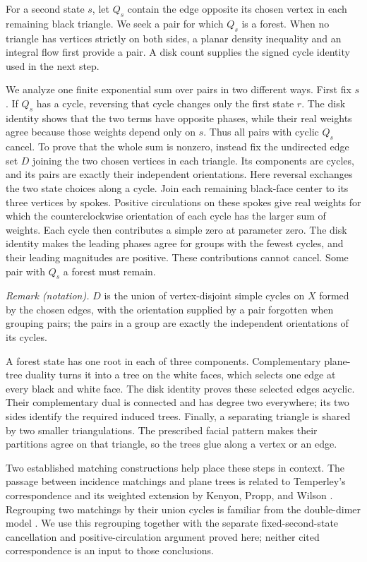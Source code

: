 \documentclass[11pt]{article}
\theoremstyle{remark}
\numberwithin{equation}{section}
\begin{document}
For a second state \(s\), let \(Q_s\) contain the edge opposite its
chosen vertex in each remaining black triangle. We seek a pair for which
\(Q_s\) is a forest. When no triangle has vertices strictly on both sides,
a planar density inequality and an integral flow first provide a pair.
A disk count supplies the signed cycle identity used in the next step.

We analyze one finite exponential sum over pairs in two different ways.
First fix \(s\). If \(Q_s\) has a cycle, reversing that cycle changes
only the first state \(r\). The disk identity shows that the two terms
have opposite phases, while their real weights agree because those
weights depend only on \(s\). Thus all pairs with cyclic \(Q_s\) cancel.
To prove that the whole sum is nonzero, instead fix the undirected edge
set \(D\) joining the two chosen vertices in each triangle. Its components
are cycles, and its pairs are exactly their independent orientations.
Here reversal exchanges the two state choices along a cycle. Join each
remaining black-face center to its three vertices by spokes. Positive circulations
on these spokes give real weights for which the counterclockwise
orientation of each cycle has the larger sum of weights.
Each cycle then contributes a simple zero at parameter zero. The disk
identity makes the leading phases agree for groups with the fewest
cycles, and their leading magnitudes are positive. These contributions
cannot cancel. Some pair with \(Q_s\) a forest must remain.

\noindent\textit{Remark (notation).} $D$ is the union of vertex-disjoint simple cycles on $X$ formed by the chosen edges, with the orientation supplied by a pair forgotten when grouping pairs; the pairs in a group are exactly the independent orientations of its cycles.


A forest state has one root in each of three components. Complementary
plane-tree duality turns it into a tree on the white faces, which selects
one edge at every black and white face. The disk identity proves these
selected edges acyclic. Their complementary dual is connected and
has degree two everywhere; its two sides identify the required induced
trees. Finally, a separating triangle is shared by two smaller
triangulations. The prescribed facial pattern makes their partitions
agree on that triangle, so the trees glue along a vertex or an edge.

Two established matching constructions help place these steps in
context. The passage between incidence matchings and plane trees
is related to Temperley's correspondence and its weighted extension
by Kenyon, Propp, and Wilson \cite{KPW2000}. Regrouping two matchings
by their union cycles is familiar from the double-dimer model
\cite[Lemma~1]{Kenyon2014}. We use this regrouping together with the
separate fixed-second-state cancellation and positive-circulation
argument proved here; neither cited correspondence is an input to
those conclusions.
\end{document}
